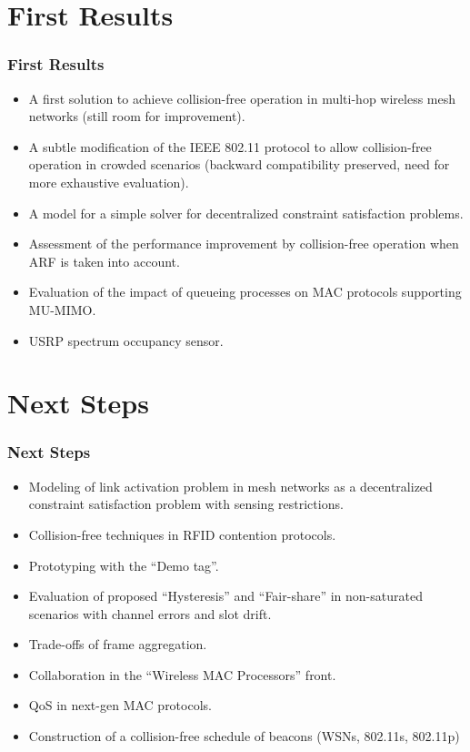 \documentclass{beamer}
\begin{document}
\section{First Results}
\begin{frame}
  \frametitle{First Results}
      \begin{block}{}
        \begin{itemize}
          \item A first solution to achieve collision-free operation in multi-hop wireless mesh networks (still room for improvement).
          \item \alert<2>{A subtle modification of the IEEE 802.11 protocol to allow collision-free operation in crowded scenarios (backward compatibility preserved, need for more exhaustive evaluation).}
          \item A model for a simple solver for decentralized constraint satisfaction problems.
          \item Assessment of the performance improvement by collision-free operation when ARF is taken into account.
          \item Evaluation of the impact of queueing processes on MAC protocols supporting MU-MIMO.
          \item USRP spectrum occupancy sensor.
        \end{itemize}
      \end{block}
\end{frame}


\section{Next Steps}
\begin{frame}
  \frametitle{Next Steps}
      \begin{block}{}
        \begin{itemize}
          \item Modeling of link activation problem in mesh networks as a decentralized constraint satisfaction problem with sensing restrictions.
          \item Collision-free techniques in RFID contention protocols.
          \item Prototyping with the ``Demo tag''.
          \item Evaluation of proposed ``Hysteresis'' and ``Fair-share'' in non-saturated scenarios with channel errors and slot drift.
          \item Trade-offs of frame aggregation.
          \item Collaboration in the ``Wireless MAC Processors'' front.
          \item QoS in next-gen MAC protocols.
          \item Construction of a collision-free schedule of beacons (WSNs, 802.11s, 802.11p)
        \end{itemize}
      \end{block}
\end{frame}
\end{document}
